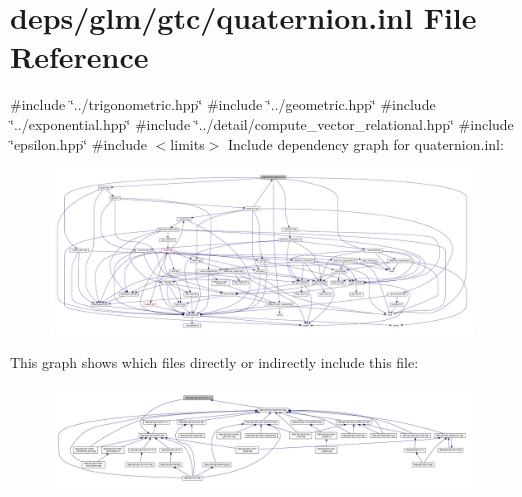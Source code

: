 \hypertarget{gtc_2quaternion_8inl}{}\section{deps/glm/gtc/quaternion.inl File Reference}
\label{gtc_2quaternion_8inl}
{\ttfamily \#include \char`\"{}../trigonometric.\+hpp\char`\"{}}\newline
{\ttfamily \#include \char`\"{}../geometric.\+hpp\char`\"{}}\newline
{\ttfamily \#include \char`\"{}../exponential.\+hpp\char`\"{}}\newline
{\ttfamily \#include \char`\"{}../detail/compute\+\_\+vector\+\_\+relational.\+hpp\char`\"{}}\newline
{\ttfamily \#include \char`\"{}epsilon.\+hpp\char`\"{}}\newline
{\ttfamily \#include $<$limits$>$}\newline
Include dependency graph for quaternion.\+inl\+:
\nopagebreak
\begin{figure}[H]
\begin{center}
\leavevmode
\includegraphics[width=350pt]{de/d3d/gtc_2quaternion_8inl__incl}
\end{center}
\end{figure}
This graph shows which files directly or indirectly include this file\+:
\nopagebreak
\begin{figure}[H]
\begin{center}
\leavevmode
\includegraphics[width=350pt]{da/d92/gtc_2quaternion_8inl__dep__incl}
\end{center}
\end{figure}
